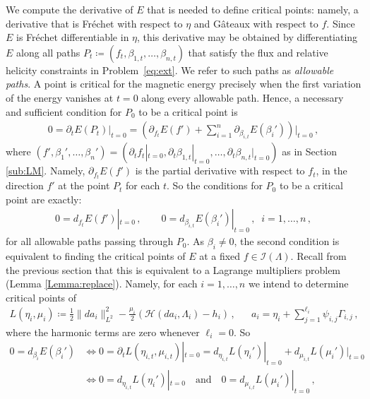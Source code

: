 \documentclass[11pt]{article}
\theoremstyle{plain}
\theoremstyle{definition}
\theoremstyle{remark}
\newcommand{\ST}{\Lambda}
\newcommand{\I}{\mathcal{I}(\ST)}
\begin{document}
We compute the derivative of \(E\) that is needed to define critical points: namely, a derivative that is Fr\'echet with respect to \(\eta\) and G\^ateaux with respect to \(f\). Since \(E\) is Fr\'echet differentiable in \(\eta\), this derivative may be obtained by differentiating \(E\) along all paths \(P_t \coloneqq (f_t, \beta_{1,t}, \dots, \beta_{n,t})\) that satisfy the flux and relative helicity constraints in Problem~\eqref{eq:ext}. We refer to such paths as \textit{allowable paths}. A point is critical for the magnetic energy precisely when the first variation of the energy vanishes at \(t=0\) along every allowable path. Hence, a necessary and sufficient condition for \(P_0\) to be a critical point is 
\begin{align*}
    0 = \partial_t E(P_t) |_{t=0}  =
     \left(  \partial_{f_t} E(f')  + \sum_{i=1}^n \partial_{ \beta_{i,t}} E( \beta_i') \right) \Bigg|_{t=0}  \, ,
\end{align*}
where \((f', \beta_{1}', \dots, \beta_{n}') = ( \partial_t f_{t}|_{t=0}, \partial_t \beta_{1,t}|_{t=0}      , \dots, \partial_t \beta_{n,t}|_{t=0} )
\) as in Section \ref{sub:LM}. Namely, \(\partial_{f_t} E(f')\) is the partial derivative with respect to \(f_t\), in the direction \(f'\) at the point \(P_t\) for each \(t\). So the conditions for \(P_0\) to be a critical point are exactly:
\begin{align} \label{eq:crit_cond_1}
    0 = d_{f_t} E(f') |_{t=0} \, , \qquad 
    0 = d_{\beta_{i,t}} E( \beta_i') |_{t=0}  \, , \; \;  i = 1, \dots, n\, ,
\end{align}
for all allowable paths passing through \(P_0\). As \(\beta_i \neq 0\), the second condition is equivalent to finding the critical points of \(E\) at a fixed \(f \in \I\). Recall from the previous section that this is equivalent to a Lagrange multipliers problem (Lemma \ref{Lemma:replace}). Namely, for each \(i = 1, \dots, n\) we intend to determine critical points of 
\begin{align*}
    L(\eta_i, \mu_i) \coloneqq \frac{1}{2} \big\| d a_i  \big\|_{L^2}^2 - \frac{\mu_i}{2} \left(   \mathscr{H}( d a_i,  \ST_i) -  h_i      \right) \, , & &
    a_i = \eta_i + \sum_{j=1}^{\ell_i}  \psi_{i,j} \Gamma_{i,j} \, ,
\end{align*}
where the harmonic terms are zero whenever \(\ell_i = 0\). So
\begin{align*}
    0 = d_{\beta_{i}} E(\beta_i') &\iff 0 = \partial_t L(\eta_{i,t}, \mu_{i,t}) |_{t=0} = d_{\eta_{i,t}} L(\eta_i') |_{t=0} +  d_{\mu_{i,t}} L(\mu_i') |_{t=0} \\ &\iff  0= d_{\eta_{i,t}} L(\eta_i') |_{t=0} \quad \text{and} \quad  0= d_{\mu_{i,t}} L(\mu_i') |_{t=0} \, ,
\end{align*}
\end{document}
